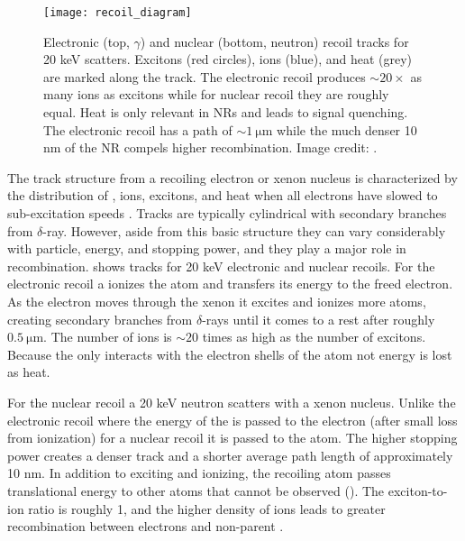 \begin{figure}
\centering
\texttt{[image: recoil\_diagram]}
\caption[Electronic (top, $\gamma$) and nuclear (bottom, neutron) recoil tracks for 20 keV scatters.]{Electronic (top, $\gamma$) and nuclear
(bottom, neutron) recoil tracks for 20 keV scatters.  Excitons (red circles), ions (blue), and
heat (grey) are marked along the track.  The electronic recoil produces ${\sim} 20 \times$ as many ions as excitons while for nuclear
recoil they are roughly equal.  Heat is only relevant in NRs and leads to signal quenching.  The electronic recoil has a path of
${\sim} 1\ \mathrm{\mu m}$ while the much denser 10 nm of the NR compels higher recombination.  Image credit: .}
\label{fig:er_nr_recoil_diagram}
\end{figure}

The track structure from a recoiling electron or xenon nucleus is characterized by the distribution of \electron, ions, excitons, and heat
when all electrons have slowed to sub-excitation speeds .  Tracks are typically cylindrical with secondary branches
from $\delta$-ray.  However, aside from this basic structure they can vary considerably with particle, energy, and
stopping power, and they play a major role in recombination.   shows tracks for 20 keV electronic and
nuclear
recoils.  For the electronic recoil a \gammaray ionizes the atom and transfers its energy to the freed electron.  As the electron moves
through the xenon it excites and ionizes more atoms, creating secondary branches from $\delta$-rays until it comes to a rest after
roughly $0.5\ \mathrm{\mu m}$.  The number of ions is ${\sim}20$ times as high as the number of excitons.  Because the \electron only
interacts with the electron shells of the atom not energy is lost as heat.

For the nuclear recoil a 20 keV neutron scatters with a xenon nucleus.  Unlike the electronic recoil where the energy of the \gammaray is
passed to the electron (after small loss from ionization) for a nuclear recoil it is passed to the atom.  The higher stopping power
creates a denser track and a shorter average path length of approximately 10 nm.  In addition to exciting and ionizing, the recoiling atom
passes translational energy to other atoms that cannot be observed ().  The exciton-to-ion ratio is roughly
1, and the higher density of ions leads to greater recombination between electrons and non-parent .


